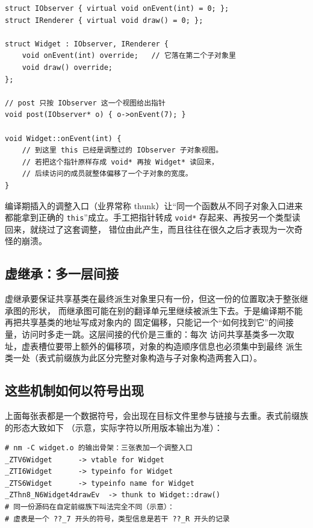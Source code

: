 \documentclass[12pt,a4paper,fontset=fandol]{ctexbook}
\newcommand{\Tp}[1]{\texttt{#1}}
\begin{document}
\begin{lstlisting}[style=cppstyle, caption={多继承下的子对象地址调整：机制示意}]
struct IObserver { virtual void onEvent(int) = 0; };
struct IRenderer { virtual void draw() = 0; };

struct Widget : IObserver, IRenderer {
    void onEvent(int) override;   // 它落在第二个子对象里
    void draw() override;
};

// post 只按 IObserver 这一个视图给出指针
void post(IObserver* o) { o->onEvent(7); }

void Widget::onEvent(int) {
    // 到这里 this 已经是调整过的 IObserver 子对象视图。
    // 若把这个指针原样存成 void* 再按 Widget* 读回来，
    // 后续访问的成员就整体偏移了一个子对象的宽度。
}
\end{lstlisting}

编译期插入的调整入口（业界常称 thunk）让“同一个函数从不同子对象入口进来都能拿到正确的
\Tp{this}”成立。手工把指针转成 \Tp{void*} 存起来、再按另一个类型读回来，就绕过了这套调整，
错位由此产生，而且往往在很久之后才表现为一次奇怪的崩溃。

\subsection{虚继承：多一层间接}\label{sec:cl13-vbase}

虚继承要保证共享基类在最终派生对象里只有一份，但这一份的位置取决于整张继承图的形状，
而继承图可能在别的翻译单元里继续被派生下去。于是编译期不能再把共享基类的地址写成对象内的
固定偏移，只能记一个“如何找到它”的间接量，访问时多走一跳。这层间接的代价是三重的：每次
访问共享基类多一次取址，虚表槽位要带上额外的偏移项，对象的构造顺序信息也必须集中到最终
派生类一处（表式前缀族为此区分完整对象构造与子对象构造两套入口）。

\subsection{这些机制如何以符号出现}\label{sec:cl13-symbols}

上面每张表都是一个数据符号，会出现在目标文件里参与链接与去重。表式前缀族的形态大致如下
（示意，实际字符以所用版本输出为准）：

\begin{lstlisting}[style=outstyle, caption={虚表与运行时类型信息对应的符号（示意）}]
# nm -C widget.o 的输出骨架：三张表加一个调整入口
_ZTV6Widget      -> vtable for Widget
_ZTI6Widget      -> typeinfo for Widget
_ZTS6Widget      -> typeinfo name for Widget
_ZThn8_N6Widget4drawEv  -> thunk to Widget::draw()
# 同一份源码在自定前缀族下叫法完全不同（示意）：
# 虚表是一个 ??_7 开头的符号，类型信息是若干 ??_R 开头的记录
\end{lstlisting}
\end{document}
